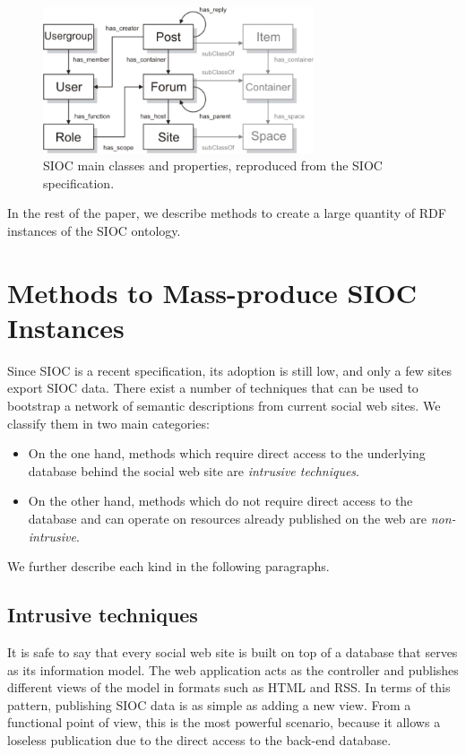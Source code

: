 \documentclass{../templates/www2008-submission}
\begin{document}
\begin{figure}
 \centering
 \includegraphics[width=8cm]{images/sioc.png}
 \caption{\label{fig:sioc}SIOC main classes and properties, reproduced from the SIOC specification.}
\end{figure}

In the rest of the paper, we describe methods to create a large
quantity of RDF instances of the SIOC ontology.


\section{Methods to Mass-produce SIOC Instances}\label{sec:taxonomy}

Since SIOC is a recent specification, its adoption is still low, and
only a few sites export SIOC data. There exist a number of techniques
that can be used to bootstrap a network of semantic descriptions from
current social web sites. We classify them in two main categories:

\begin{itemize}
\item On the one hand, methods which require direct access to the underlying database behind
the social web site are \emph{intrusive techniques}.
\item On the other hand, methods which do not require direct access to
the database and can operate on resources already published on the web
are \emph{non-intrusive}.
\end{itemize}

We further describe each kind in the following paragraphs.

\subsection{Intrusive techniques}

It is safe to say that every social web site is built on top of a
database that serves as its information model. The web application
acts as the controller and publishes different views of the model in
formats such as HTML and RSS. In terms of this pattern, publishing
SIOC data is as simple as adding a new view.
From a functional point of view, this is the most powerful scenario, because
it allows a loseless publication due to the direct access
to the back-end database.
\end{document}
